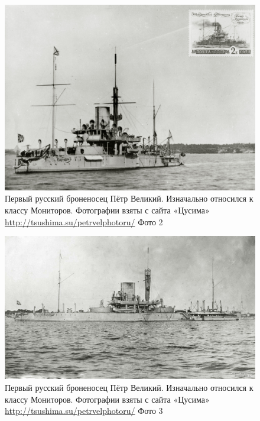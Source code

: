 \begin{figure}[h!tb] 
	\centering\includegraphics[scale=0.2]{Data/RYAV_sily_storon/wiYS26wh4ZQ.jpg}
	\caption{Первый русский броненосец Пётр Великий. Изначально относился к классу Мониторов. Фотографии взяты с сайта «Цусима» \url{http://tsushima.su/petrvelphotoru/} Фото 2}%
\end{figure}
\begin{figure}[h!tb] 
	\centering\includegraphics[scale=0.2]{Data/RYAV_sily_storon/dQQjFe6_e2U.jpg}
	\caption{Первый русский броненосец Пётр Великий. Изначально относился к классу Мониторов. Фотографии взяты с сайта «Цусима» \url{http://tsushima.su/petrvelphotoru/} Фото 3}%
\end{figure}

